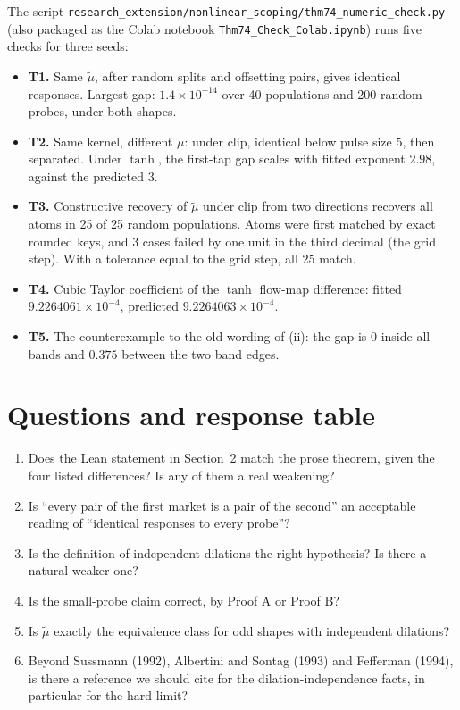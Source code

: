 \documentclass[11pt]{article}
\begin{document}
The script \texttt{research\_extension/nonlinear\_scoping/thm74\_numeric\_check.py} (also packaged as the Colab notebook \texttt{Thm74\_Check\_Colab.ipynb}) runs five checks for three seeds:
\begin{itemize}[itemsep=1pt]
\item \textbf{T1.} Same $\tilde\mu$, after random splits and offsetting pairs, gives identical responses. Largest gap: $1.4\times10^{-14}$ over 40 populations and 200 random probes, under both shapes.
\item \textbf{T2.} Same kernel, different $\tilde\mu$: under clip, identical below pulse size $5$, then separated. Under $\tanh$, the first-tap gap scales with fitted exponent $2.98$, against the predicted $3$.
\item \textbf{T3.} Constructive recovery of $\tilde\mu$ under clip from two directions recovers all atoms in 25 of 25 random populations. Atoms were first matched by exact rounded keys, and 3 cases failed by one unit in the third decimal (the grid step). With a tolerance equal to the grid step, all 25 match.
\item \textbf{T4.} Cubic Taylor coefficient of the $\tanh$ flow-map difference: fitted $9.2264061\times10^{-4}$, predicted $9.2264063\times10^{-4}$.
\item \textbf{T5.} The counterexample to the old wording of (ii): the gap is $0$ inside all bands and $0.375$ between the two band edges.
\end{itemize}

\section{Questions and response table}

\begin{enumerate}[itemsep=2pt]
\item Does the Lean statement in Section~2 match the prose theorem, given the four listed differences? Is any of them a real weakening?
\item Is ``every pair of the first market is a pair of the second'' an acceptable reading of ``identical responses to every probe''?
\item Is the definition of independent dilations the right hypothesis? Is there a natural weaker one?
\item Is the small-probe claim correct, by Proof A or Proof B?
\item Is $\tilde\mu$ exactly the equivalence class for odd shapes with independent dilations?
\item Beyond Sussmann (1992), Albertini and Sontag (1993) and Fefferman (1994), is there a reference we should cite for the dilation-independence facts, in particular for the hard limit?
\end{enumerate}
\end{document}
